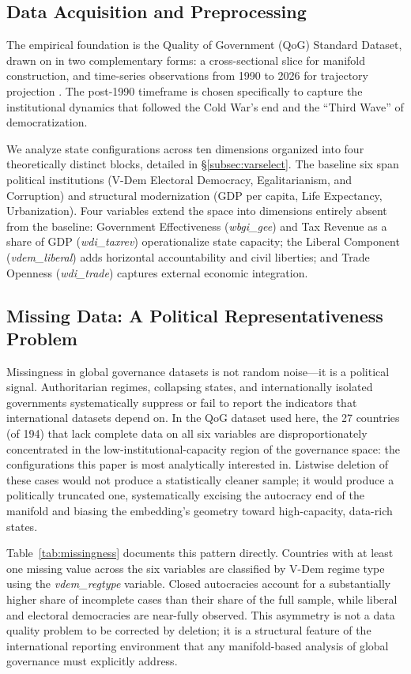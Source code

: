 \documentclass[12pt]{article}
\begin{document}
\subsection{Data Acquisition and Preprocessing}
The empirical foundation is the Quality of Government (QoG) Standard Dataset, drawn on in two complementary forms: a cross-sectional slice for manifold construction, and time-series observations from 1990 to 2026 for trajectory projection \cite{teorell2026qog}. The post-1990 timeframe is chosen specifically to capture the institutional dynamics that followed the Cold War's end and the ``Third Wave'' of democratization.

We analyze state configurations across ten dimensions organized into four theoretically distinct blocks, detailed in \S\ref{subsec:varselect}. The baseline six span political institutions (V-Dem Electoral Democracy, Egalitarianism, and Corruption) and structural modernization (GDP per capita, Life Expectancy, Urbanization). Four variables extend the space into dimensions entirely absent from the baseline: Government Effectiveness (\textit{wbgi\_gee}) and Tax Revenue as a share of GDP (\textit{wdi\_taxrev}) operationalize state capacity; the Liberal Component (\textit{vdem\_liberal}) adds horizontal accountability and civil liberties; and Trade Openness (\textit{wdi\_trade}) captures external economic integration.

\subsection{Missing Data: A Political Representativeness Problem}

Missingness in global governance datasets is not random noise—it is a political signal. Authoritarian regimes, collapsing states, and internationally isolated governments systematically suppress or fail to report the indicators that international datasets depend on. In the QoG dataset used here, the 27 countries (of 194) that lack complete data on all six variables are disproportionately concentrated in the low-institutional-capacity region of the governance space: the configurations this paper is most analytically interested in. Listwise deletion of these cases would not produce a statistically cleaner sample; it would produce a politically truncated one, systematically excising the autocracy end of the manifold and biasing the embedding's geometry toward high-capacity, data-rich states.

Table~\ref{tab:missingness} documents this pattern directly. Countries with at least one missing value across the six variables are classified by V-Dem regime type using the \textit{vdem\_regtype} variable. Closed autocracies account for a substantially higher share of incomplete cases than their share of the full sample, while liberal and electoral democracies are near-fully observed. This asymmetry is not a data quality problem to be corrected by deletion; it is a structural feature of the international reporting environment that any manifold-based analysis of global governance must explicitly address.
\end{document}
